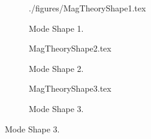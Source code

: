 \begin{figure}
	\def\cs{.29}
	\begin{subfigure}{\cs\textwidth}
		\centering
		\def\width{\linewidth}
		\def\height{\linewidth}
		{./figures/MagTheoryShape1.tex}
		\caption{Mode Shape 1.}
		\label{fig:MagTheoryShape1}
	\end{subfigure}
	\begin{subfigure}{\cs\textwidth}
		\centering
		\def\width{\linewidth}
		\def\height{\linewidth}
		{MagTheoryShape2.tex}
		\caption{Mode Shape 2.}
		\label{fig:MagTheoryShape2}
	\end{subfigure}
	\begin{subfigure}{\cs\textwidth}
		\centering
		\def\width{\linewidth}
		\def\height{\linewidth}
		{MagTheoryShape3.tex}
		\caption{Mode Shape 3.}
		\label{fig:MagTheoryShape3}
	\end{subfigure}
\end{figure}
